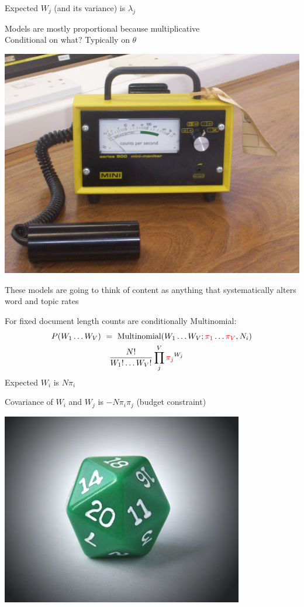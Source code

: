 \documentclass[11pt,compress,professionalfonts]{beamer}
\begin{document}
Expected $W_{j}$ (and its variance) is $\lambda_{j}$

Models are mostly proportional because multiplicative
~\\
Conditional on what?  Typically on $\theta$


\centerline{\includegraphics[scale=.2]{pictures/geiger_counter}}


These models are going to think of content as anything that systematically alters word and topic rates



For fixed document length counts are conditionally Multinomial:
\begin{align*}
P(W_{1}\ldots W_{V}) &~=~ \text{Multinomial}(W_{1}\ldots W_{V}; \textcolor{red}{\pi_{1}}\ldots\textcolor{red}{\pi_{V}}, N_i)\\
                     &~~~\frac{N!}{W_{1}!\ldots W_{V}!} \prod^{V}_{j} \textcolor{red}{\pi_{j}}^{W_{j}}
\end{align*}
Expected $W_{i}$ is $N\pi_{i}$

Covariance of $W_{i}$ and $W_{j}$ is $-N \pi_{i}\pi_{j}$ (budget constraint)


\centerline{\includegraphics[scale=1]{pictures/20-sided-die}}
\end{document}
